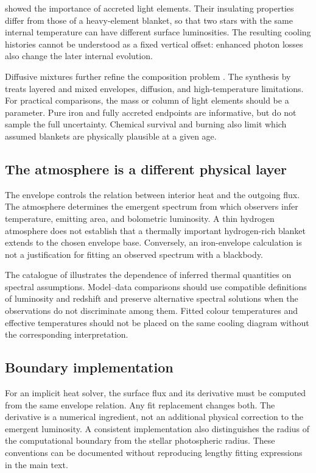 \documentclass{aa}
\begin{document}
\citet{Potekhin1997} showed the importance of accreted light elements. Their insulating properties differ from those of a heavy-element blanket, so that two stars with the same internal temperature can have different surface luminosities. The resulting cooling histories cannot be understood as a fixed vertical offset: enhanced photon losses also change the later internal evolution.

Diffusive mixtures further refine the composition problem \citep{Beznogov2016}. The synthesis by \citet{Beznogov2021} treats layered and mixed envelopes, diffusion, and high-temperature limitations. For practical comparisons, the mass or column of light elements should be a parameter. Pure iron and fully accreted endpoints are informative, but do not sample the full uncertainty. Chemical survival and burning also limit which assumed blankets are physically plausible at a given age.

\subsection{The atmosphere is a different physical layer}
The envelope controls the relation between interior heat and the outgoing flux. The atmosphere determines the emergent spectrum from which observers infer temperature, emitting area, and bolometric luminosity. A thin hydrogen atmosphere does not establish that a thermally important hydrogen-rich blanket extends to the chosen envelope base. Conversely, an iron-envelope calculation is not a justification for fitting an observed spectrum with a blackbody.

The catalogue of \citet{Potekhin2020} illustrates the dependence of inferred thermal quantities on spectral assumptions. Model--data comparisons should use compatible definitions of luminosity and redshift and preserve alternative spectral solutions when the observations do not discriminate among them. Fitted colour temperatures and effective temperatures should not be placed on the same cooling diagram without the corresponding interpretation.

\subsection{Boundary implementation}
For an implicit heat solver, the surface flux and its derivative must be computed from the same envelope relation. Any fit replacement changes both. The derivative is a numerical ingredient, not an additional physical correction to the emergent luminosity. A consistent implementation also distinguishes the radius of the computational boundary from the stellar photospheric radius. These conventions can be documented without reproducing lengthy fitting expressions in the main text.
\end{document}
